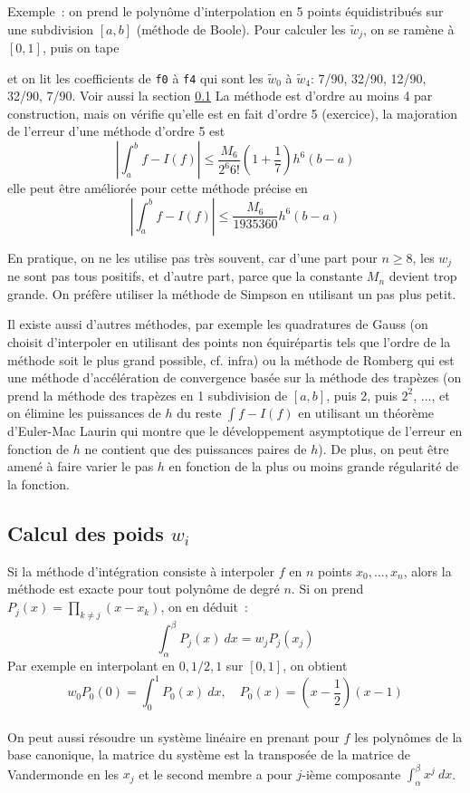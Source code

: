 \documentclass[a4paper,11pt]{article}
\begin{document}
\begin{giacjshere}
Exemple~: on prend le polyn\^ome d'interpolation en 5 points 
\'equidistribu\'es sur une subdivision $[a,b]$ (m\'ethode de Boole). 
Pour calculer les
$\tilde{w}_j$, on se ram\`ene \`a $[0,1]$, puis on tape
\begin{center}
\end{center}
et on lit les coefficients de \verb|f0| \`a \verb|f4|
qui sont les $\tilde{w}_0$ \`a  $\tilde{w}_4$: 7/90, 32/90, 12/90,
32/90, 7/90. Voir aussi la section \ref{sec:poids}
La m\'ethode est d'ordre au moins 4 par construction, mais on v\'erifie
qu'elle est en fait d'ordre 5 (exercice), la majoration de l'erreur
d'une m\'ethode d'ordre 5 est 
\[ |\int_a^b f -I(f)| \leq \frac{M_6}{2^6 6!}(1+\frac{1}{7}) h^6 (b-a) \]
elle peut \^etre am\'elior\'ee pour cette m\'ethode pr\'ecise en
\[ |\int_a^b f -I(f)| \leq \frac{M_6}{1935360} h^6 (b-a) \]

En pratique, on ne les utilise pas tr\`es souvent, car d'une part
pour $n\geq 8$, les $w_j$ ne sont pas tous positifs, et
d'autre part, parce que la constante $M_n$ devient trop
grande. On pr\'ef\`ere utiliser la m\'ethode de Simpson en utilisant
un pas plus petit.

Il existe aussi d'autres m\'ethodes, par exemple les quadratures de Gauss
(on choisit d'interpoler en utilisant des points non \'equir\'epartis 
tels que l'ordre de la m\'ethode soit le plus grand possible, cf. infra)
ou la m\'ethode de Romberg qui est une m\'ethode d'acc\'el\'eration
de convergence bas\'ee sur la m\'ethode des trap\`ezes (on prend
la m\'ethode des trap\`ezes en 1 subdivision de $[a,b]$, puis
2, puis $2^2$, ..., et on \'elimine les puissances de $h$
du reste $\int f-I(f)$ en utilisant un th\'eor\`eme d'Euler-Mac Laurin
qui montre que le d\'eveloppement asymptotique de
l'erreur en fonction de $h$ ne contient que des puissances paires
de $h$). De plus, on peut être amen\'e à faire varier le pas $h$
en fonction de la plus ou moins grande r\'egularit\'e de la fonction.


\subsection{Calcul des poids $w_i$} \label{sec:poids}
Si la m\'ethode d'int\'egration consiste \`a interpoler 
$f$ en $n$ points $x_0,...,x_n$, alors la m\'ethode est exacte pour
tout polyn\^ome de degr\'e $n$. Si on prend 
$P_j(x)=\prod_{k \neq j}(x-x_k)$, on en d\'eduit~:
$$ \int_\alpha^\beta P_j(x) \ dx = w_j P_j(x_j) $$ 
Par exemple en interpolant en $0,1/2,1$ sur $[0,1]$, on obtient
$$w_0 P_0(0)=\int_0^1 P_0(x) \ dx, \quad P_0(x)=(x-\frac{1}{2})(x-1)$$
\\
On peut aussi r\'esoudre un syst\`eme lin\'eaire en prenant pour $f$
les polyn\^omes de la base canonique, la matrice du syst\`eme est
la transpos\'ee de la matrice de Vandermonde en les $x_j$ et le second
membre a pour $j$-i\`eme composante $\int_\alpha^\beta x^j \ dx$.



\end{giacjshere}
\end{document}
